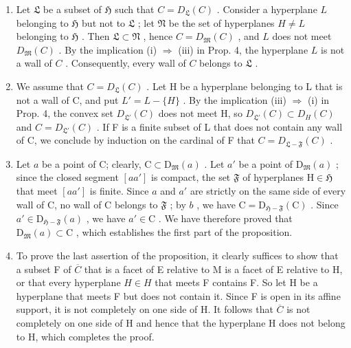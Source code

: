 \begin{enumerate}
\def\labelenumi{\alph{enumi})}
\item
  Let \(\mathfrak{L}\) be a subset of \(\mathfrak{H}\) such that \(C = D_{\mathfrak{L}}(C)\) . Consider a hyperplane \(L\) belonging to \(\mathfrak{H}\) but not to \(\mathfrak{L}\) ; let \(\mathfrak{N}\) be the set of hyperplanes \(H \neq L\) belonging to \(\mathfrak{H}\) . Then \(\mathfrak{L} \subset \mathfrak{N}\) , hence \(C = D_{\mathfrak{M}}(C)\) , and \(L\) does not meet \(D_{\mathfrak{M}}(C)\) . By the implication (i) \(\Longrightarrow\) (iii) in Prop. 4, the hyperplane \(L\) is not a wall of \(C\) . Consequently, every wall of \(C\) belongs to \(\mathfrak{L}\) .
\item
  We assume that \(C = D_{\mathfrak{L}}(C)\) . Let H be a hyperplane belonging to L that is not a wall of C, and put \(L' = L - \{H\}\) . By the implication (iii) \(\Longrightarrow\) (i) in Prop. 4, the convex set \(D_{\mathfrak{L}'}(C)\) does not meet H, so \(D_{\mathfrak{L}'}(C) \subset D_{H}(C)\) and \(C = D_{\mathfrak{L}'}(C)\) . If F is a finite subset of L that does not contain any wall of C, we conclude by induction on the cardinal of F that \(C = D_{\mathfrak{L} - \mathfrak{F}}(C)\) .
\item
  Let \(a\) be a point of C; clearly, \(\mathrm{C} \subset \mathrm{D}_{\mathfrak{M}}(a)\) . Let \(a'\) be a point of \(\mathrm{D}_{\mathfrak{M}}(a)\) ; since the closed segment \([aa']\) is compact, the set \(\mathfrak{F}\) of hyperplanes \(\mathrm{H} \in \mathfrak{H}\) that meet \([aa']\) is finite. Since \(a\) and \(a'\) are strictly on the same side of every wall of C, no wall of C belongs to \(\mathfrak{F}\) ; by \(b\) , we have \(\mathrm{C} = \mathrm{D}_{\mathfrak{H}-\mathfrak{F}}(\mathrm{C})\) . Since \(a' \in \mathrm{D}_{\mathfrak{H}-\mathfrak{F}}(a)\) , we have \(a' \in \mathrm{C}\) . We have therefore proved that \(\mathrm{D}_{\mathfrak{M}}(a) \subset \mathrm{C}\) , which establishes the first part of the proposition.
\item
  To prove the last assertion of the proposition, it clearly suffices to show that a subset F of \(\overline{C}\) that is a facet of E relative to M is a facet of E relative to H, or that every hyperplane \(H \in H\) that meets F contains F. So let H be a hyperplane that meets F but does not contain it. Since F is open in its affine support, it is not completely on one side of H. It follows that \(\overline{C}\) is not completely on one side of H and hence that the hyperplane H does not belong to H, which completes the proof.
\end{enumerate}

